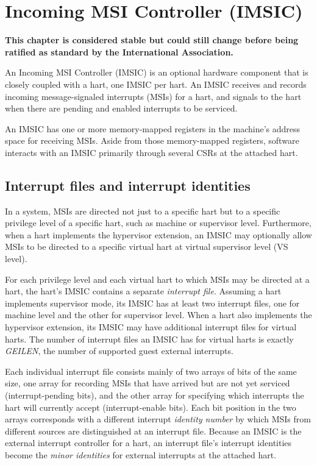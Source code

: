 
\chapter{Incoming MSI Controller (IMSIC)}
\label{ch:IMSIC}

\textbf{%
This chapter is considered stable but could still change before being
ratified as standard by the {\RISCV} International Association.%
}
\bigskip

An Incoming MSI Controller (IMSIC) is an optional {\RISCV} hardware
component that is closely coupled with a hart, one IMSIC per hart.
An IMSIC receives and records incoming message-signaled interrupts
(MSIs) for a hart, and signals to the hart when there are pending and
enabled interrupts to be serviced.

An IMSIC has one or more memory-mapped registers in the machine's
address space for receiving MSIs.
Aside from those memory-mapped registers, software interacts with an
IMSIC primarily through several {\RISCV} CSRs at the attached hart.

\section{Interrupt files and interrupt identities}
\label{sec:IMSIC-intrFilesAndIdents}

In a {\RISCV} system, MSIs are directed not just to a specific hart but
to a specific privilege level of a specific hart, such as machine or
supervisor level.
Furthermore, when a hart implements the hypervisor extension, an IMSIC
may optionally allow MSIs to be directed to a specific virtual hart at
virtual supervisor level (VS level).

For each privilege level and each virtual hart to which MSIs
may be directed at a hart, the hart's IMSIC contains a separate
\emph{interrupt file}.
Assuming a hart implements supervisor mode, its IMSIC has at least two
interrupt files, one for machine level and the other for supervisor
level.
When a hart also implements the hypervisor extension, its IMSIC may
have additional interrupt files for virtual harts.
The number of interrupt files an IMSIC has for virtual harts is exactly
\emph{GEILEN}, the number of supported guest external interrupts.

Each individual interrupt file consists mainly of two arrays of bits
of the same size, one array for recording MSIs that have arrived but
are not yet serviced (interrupt-pending bits), and the other array
for specifying which interrupts the hart will currently accept
(interrupt-enable bits).
Each bit position in the two arrays corresponds with a different
interrupt \emph{identity number} by which MSIs from different sources
are distinguished at an interrupt file.
Because an IMSIC is the external interrupt controller for
a hart, an interrupt file's interrupt identities become the
\emph{minor identities} for external interrupts at the attached hart.

